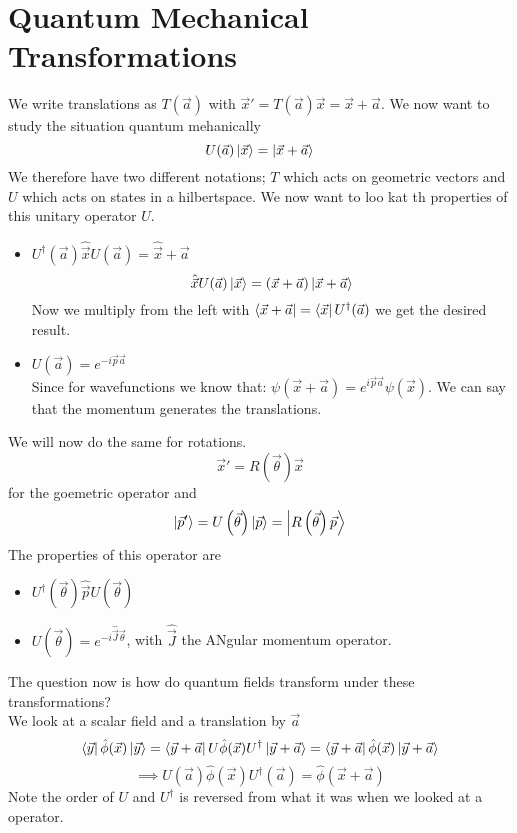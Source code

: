 \documentclass{report}
\begin{document}
\chapter{Quantum Mechanical Transformations}
We write translations as $T(\vec{a})$ with $\vec{x}' = T(\vec{a}) \vec{x} = \vec{x} + \vec{a}$. We now want to study the situation quantum mehanically  \[
	U(\vec{a}) \ket{\vec{x}} = \ket{\vec{x} + \vec{a}}
\] We therefore have two different notations; $T$ which acts on geometric vectors and $U$ which acts on states in a hilbertspace. We now want to loo kat th properties of this unitary operator $U$.
\begin{itemize}
	\item $U^\dagger(\vec{a}) \hat{\vec{x}} U(\vec{a}) = \hat{\vec{x}} + \vec{a}$ \[
			\hat{\vec{x}} U(\vec{a}) \ket{\vec{x}} = (\vec{x} + \vec{a} )\ket{\vec{x} + \vec{a}}
			\] Now we multiply from the left with $\bra{\vec{x} + \vec{a}} = \bra{\vec{x}} U^\dagger(\vec{a})$ we get the desired result.
		\item $U(\vec{a}) = e^{-i\vec{p}\vec{a}}$\\
			Since for wavefunctions we know that: $\psi(\vec{x} + \vec{a}) = e^{i\vec{p}\vec{a}} \psi(\vec{x})$. We can say that the momentum generates the translations.
\end{itemize}
We will now do the same for rotations. \[
	\vec{x}' = R\left( \vec{\theta} \right) \vec{x}
\] for the goemetric operator and \[
\ket{\vec{p}'} = U\left( \vec{\theta} \right) \ket{\vec{p}} = \ket{R\left( \vec{\theta} \right) \vec{p}}
\] The properties of this operator are 
\begin{itemize}
	\item $U^\dagger(\vec{\theta}) \hat{\vec{p}} U(\vec{\theta})$
	\item $U\left( \vec{\theta} \right) = e^{-i \hat{\vec{J}} \vec{\theta}}$, with $\hat{\vec{J}}$ the ANgular momentum operator.
\end{itemize}
The question now is how do quantum fields transform under these transformations?\\
We look at a scalar field and a translation by $\vec{a}$ \[
	\bra{\vec{y}} \hat{\phi }(\vec{x}) \ket{\vec{y}} = \bra{\vec{y} + \vec{a}} U \hat{\phi }(\vec{x}) U^\dagger \ket{\vec{y} + \vec{a}} =  \bra{ \vec{y} + \vec{a}} \hat{\phi }(\vec{x}) \ket{\vec{y} + \vec{a}}
\] \[
\implies U(\vec{a}) \hat{\phi }(\vec{x}) U^\dagger(\vec{a}) = \hat{\phi }(\vec{x} + \vec{a})
\] Note the order of $U$ and $U^\dagger$ is reversed from what it was when we looked at a operator.\\
\end{document}
